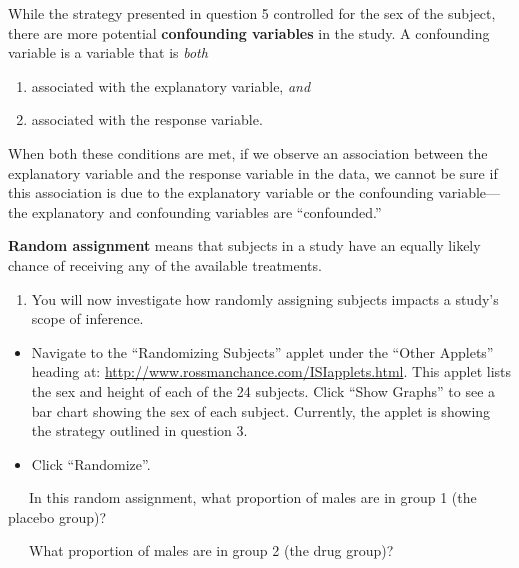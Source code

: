 \documentclass[
]{report}
\providecommand{\tightlist}{%
  \setlength{\itemsep}{0pt}\setlength{\parskip}{0pt}}
\begin{document}
While the strategy presented in question 5 controlled for the sex of the subject, there are more potential \textbf{confounding variables} in the study. A confounding variable is a variable that is \emph{both}

\begin{enumerate}
\def\labelenumi{\arabic{enumi}.}
\tightlist
\item
  associated with the explanatory variable, \emph{and}
\item
  associated with the response variable.
\end{enumerate}

When both these conditions are met, if we observe an association between the explanatory variable and the response variable in the data, we cannot be sure if this association is due to the explanatory variable or the confounding variable---the explanatory and confounding variables are ``confounded.''

\textbf{Random assignment} means that subjects in a study have an equally likely chance of receiving any of the available treatments.

\newpage

\begin{enumerate}
\def\labelenumi{\arabic{enumi}.}
\setcounter{enumi}{5}
\tightlist
\item
  You will now investigate how randomly assigning subjects impacts a study's scope of inference.
\end{enumerate}

\begin{itemize}
\item
  Navigate to the ``Randomizing Subjects'' applet under the ``Other Applets'' heading at: \url{http://www.rossmanchance.com/ISIapplets.html}. This applet lists the sex and height of each of the 24 subjects. Click ``Show Graphs'' to see a bar chart showing the sex of each subject. Currently, the applet is showing the strategy outlined in question 3.
\item
  Click ``Randomize''.
\end{itemize}

~~~In this random assignment, what proportion of males are in group 1 (the placebo group)?

\vspace{0.1in}

~~~What proportion of males are in group 2 (the drug group)?

\vspace{0.1in}
\end{document}
